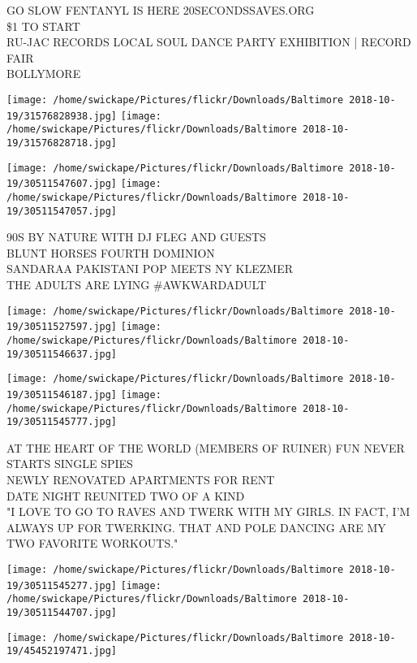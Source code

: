 \documentclass[10pt,letterpaper]{article}
\begin{document}
GO SLOW FENTANYL IS HERE 20SECONDSSAVES.ORG\\
\$1 TO START\\
RU{-}JAC RECORDS LOCAL SOUL DANCE PARTY EXHIBITION | RECORD FAIR\\
BOLLYMORE
\pagebreak

\texttt{[image: /home/swickape/Pictures/flickr/Downloads/Baltimore 2018-10-19/31576828938.jpg]}
\texttt{[image: /home/swickape/Pictures/flickr/Downloads/Baltimore 2018-10-19/31576828718.jpg]}

\texttt{[image: /home/swickape/Pictures/flickr/Downloads/Baltimore 2018-10-19/30511547607.jpg]}
\texttt{[image: /home/swickape/Pictures/flickr/Downloads/Baltimore 2018-10-19/30511547057.jpg]}

90S BY NATURE WITH DJ FLEG AND GUESTS\\
BLUNT HORSES FOURTH DOMINION\\
SANDARAA PAKISTANI POP MEETS NY KLEZMER\\
THE ADULTS ARE LYING \#AWKWARDADULT
\pagebreak

\texttt{[image: /home/swickape/Pictures/flickr/Downloads/Baltimore 2018-10-19/30511527597.jpg]}
\texttt{[image: /home/swickape/Pictures/flickr/Downloads/Baltimore 2018-10-19/30511546637.jpg]}

\texttt{[image: /home/swickape/Pictures/flickr/Downloads/Baltimore 2018-10-19/30511546187.jpg]}
\texttt{[image: /home/swickape/Pictures/flickr/Downloads/Baltimore 2018-10-19/30511545777.jpg]}

AT THE HEART OF THE WORLD (MEMBERS OF RUINER) FUN NEVER STARTS SINGLE SPIES\\
NEWLY RENOVATED APARTMENTS FOR RENT\\
DATE NIGHT REUNITED TWO OF A KIND\\
"I LOVE TO GO TO RAVES AND TWERK WITH MY GIRLS.  IN FACT, I'M ALWAYS UP FOR TWERKING.  THAT AND POLE DANCING ARE MY TWO FAVORITE WORKOUTS."
\pagebreak

\texttt{[image: /home/swickape/Pictures/flickr/Downloads/Baltimore 2018-10-19/30511545277.jpg]}
\texttt{[image: /home/swickape/Pictures/flickr/Downloads/Baltimore 2018-10-19/30511544707.jpg]}

\vspace{0.25in}
\texttt{[image: /home/swickape/Pictures/flickr/Downloads/Baltimore 2018-10-19/45452197471.jpg]}
\end{document}
